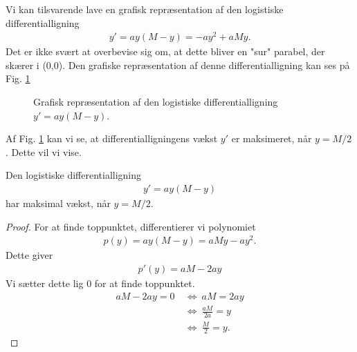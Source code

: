 Vi kan tilsvarende lave en grafisk repræsentation af den logistiske differentialligning
\begin{align*}
	y' = ay(M-y) = -ay^2+aMy.
\end{align*}
Det er ikke svært at overbevise sig om, at dette bliver en "sur" parabel, der skærer i (0,0). Den grafiske repræsentation af denne differentialligning kan ses på Fig. \ref{fig:logist}
\begin{figure}[H]
	\centering
	\caption{Grafisk repræsentation af den logistiske differentialligning $y' = ay(M-y)$.}
	\label{fig:logist}
\end{figure}
Af Fig. \ref{fig:logist} kan vi se, at differentialligningens vækst $y'$ er maksimeret, når $y = M/2$. Dette vil vi vise.
\begin{setn}
	Den logistiske differentialligning 
	\begin{align*}
		y' = ay(M-y)
	\end{align*}
	har maksimal vækst, når $y = M/2$. 
\end{setn}
\begin{proof}
	For at finde toppunktet, differentierer vi polynomiet 
	\begin{align*}
		p(y) =ay(M-y) = aMy-ay^2.
	\end{align*}
	Dette giver
	\begin{align*}
		p'(y) = aM-2ay
	\end{align*}
	Vi sætter dette lig 0 for at finde toppunktet.
	\begin{align*}
		aM-2ay = 0 \ &\Leftrightarrow \ aM = 2ay \\
		&\Leftrightarrow	 \ \frac{aM}{2a} = y \\
		&\Leftrightarrow	 \ \frac{M}{2} = y.
	\end{align*}
\end{proof}

